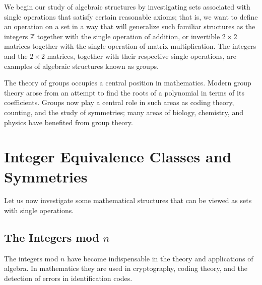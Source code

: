 


We begin our study of  algebraic structures by investigating sets associated with single operations that satisfy certain reasonable axioms; that is, we want to define an operation on a set in a way that will generalize such familiar structures as the integers ${\mathbb Z}$ together with the single operation of  addition, or invertible $2 \times 2$ matrices together with the single operation of matrix multiplication.  The integers and the $2 \times 2$ matrices, together with their respective single operations, are examples of algebraic structures known as groups. 

The theory of groups occupies a central position in mathematics.  Modern group theory arose from an attempt to find the roots of a polynomial in terms of its coefficients.  Groups now play a central role in such areas as coding theory, counting, and the study of  symmetries; many areas of biology, chemistry, and physics have benefited from group theory.

 
\section{Integer Equivalence Classes and Symmetries}\label{Section_mod_N_sym}
 
Let us now investigate some mathematical structures that can be viewed as sets with single operations. 
 
 
\subsection*{The Integers mod $n$}

The integers mod $n$ have become indispensable in the theory and applications of algebra.  In mathematics they are used in cryptography, coding theory, and the detection of errors in identification codes.
 
